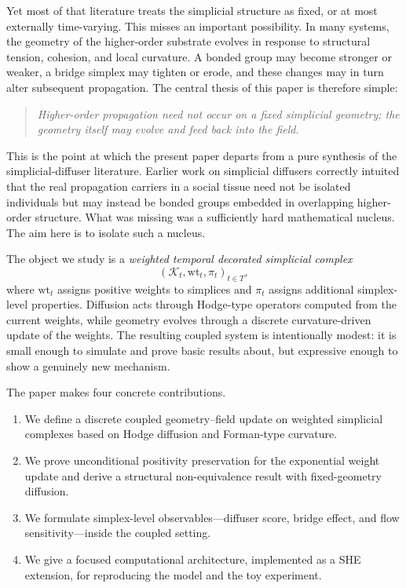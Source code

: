 \documentclass[11pt]{article}
\newcommand{\K}{\mathcal{K}}
\newcommand{\wt}{\mathrm{wt}}
\begin{document}
Yet most of that literature treats the simplicial structure as fixed, or at most externally time-varying. This misses an important possibility. In many systems, the geometry of the higher-order substrate evolves in response to structural tension, cohesion, and local curvature. A bonded group may become stronger or weaker, a bridge simplex may tighten or erode, and these changes may in turn alter subsequent propagation. The central thesis of this paper is therefore simple:

\begin{quote}
\emph{Higher-order propagation need not occur on a fixed simplicial geometry; the geometry itself may evolve and feed back into the field.}
\end{quote}

This is the point at which the present paper departs from a pure synthesis of the simplicial-diffuser literature. Earlier work on simplicial diffusers correctly intuited that the real propagation carriers in a social tissue need not be isolated individuals but may instead be bonded groups embedded in overlapping higher-order structure. What was missing was a sufficiently hard mathematical nucleus. The aim here is to isolate such a nucleus.

The object we study is a \emph{weighted temporal decorated simplicial complex}
\[
(\K_t,\wt_t,\pi_t)_{t\in T},
\]
where $\wt_t$ assigns positive weights to simplices and $\pi_t$ assigns additional simplex-level properties. Diffusion acts through Hodge-type operators computed from the current weights, while geometry evolves through a discrete curvature-driven update of the weights. The resulting coupled system is intentionally modest: it is small enough to simulate and prove basic results about, but expressive enough to show a genuinely new mechanism.

The paper makes four concrete contributions.
\begin{enumerate}[label=(\roman*)]
    \item We define a discrete coupled geometry--field update on weighted simplicial complexes based on Hodge diffusion and Forman-type curvature.
    \item We prove unconditional positivity preservation for the exponential weight update and derive a structural non-equivalence result with fixed-geometry diffusion.
    \item We formulate simplex-level observables---diffuser score, bridge effect, and flow sensitivity---inside the coupled setting.
    \item We give a focused computational architecture, implemented as a SHE extension, for reproducing the model and the toy experiment.
\end{enumerate}
\end{document}
